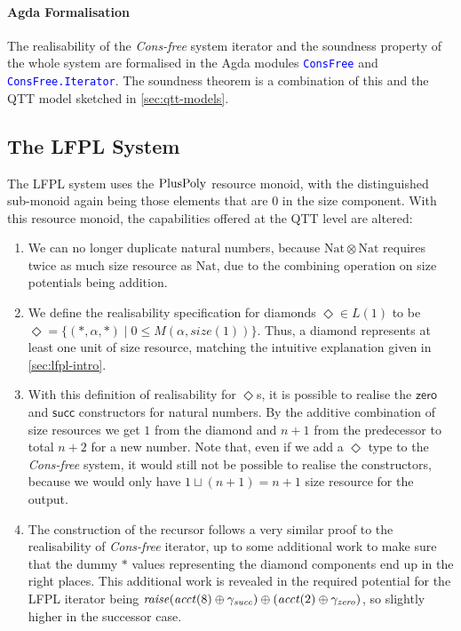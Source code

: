 \documentclass[acmsmall,screen]{acmart}
\newcommand{\tyNat}{\mathrm{Nat}}
\newcommand{\conZero}{\mathsf{zero}}
\newcommand{\conSucc}{\mathsf{succ}}
\newcommand{\ConsFree}{\emph{Cons-free}}
\newcommand{\AgdaModule}[1]{\textcolor{blue}{\tt #1}}
\begin{document}
\paragraph{Agda Formalisation} The realisability of the
\ConsFree{} system iterator and the soundness property of the
whole system are formalised in the Agda modules \AgdaModule{ConsFree}
and \AgdaModule{ConsFree.Iterator}. The soundness theorem is a
combination of this and the QTT model sketched in
\autoref{sec:qtt-models}.

\subsection{The LFPL System}
\label{sec:lfpl-sound}

The LFPL system uses the $\mathrm{PlusPoly}$ resource monoid, with the
distinguished sub-monoid again being those elements that are $0$ in
the size component. With this resource monoid, the capabilities
offered at the QTT level are altered:
\begin{enumerate}
\item We can no longer duplicate natural numbers, because
  $\tyNat \otimes \tyNat$ requires twice as much size resource as
  $\tyNat$, due to the combining operation on size potentials being
  addition.
\item We define the realisability specification for diamonds
  $\Diamond \in L(1)$ to be
  $\Diamond = \{ (*, \alpha, *) \mid 0 \leq M(\alpha,
  \mathit{size}(1)) \}$.  Thus, a diamond represents at least one unit
  of size resource, matching the intuitive explanation given in
  \autoref{sec:lfpl-intro}.
\item With this definition of realisability for $\Diamond$s, it is
  possible to realise the $\conZero$ and $\conSucc$ constructors for
  natural numbers. By the additive combination of size resources we
  get $1$ from the diamond and $n+1$ from the predecessor to total
  $n+2$ for a new number. Note that, even if we add a $\Diamond$ type
  to the \ConsFree{} system, it would still not be possible to
  realise the constructors, because we would only have
  $1 \sqcup (n+1) = n+1$ size resource for the output.
\item The construction of the recursor follows a very similar proof to
  the realisability of \ConsFree{} iterator, up to some
  additional work to make sure that the dummy $*$ values representing
  the diamond components end up in the right places. This additional
  work is revealed in the required potential for the LFPL iterator
  being
  $\mathit{raise}(\mathit{acct}(8) \oplus \gamma_{\mathit{succ}})
  \oplus (\mathit{acct}(2) \oplus \gamma_{\mathit{zero}})$, so
  slightly higher in the successor case.
\end{enumerate}
\end{document}
